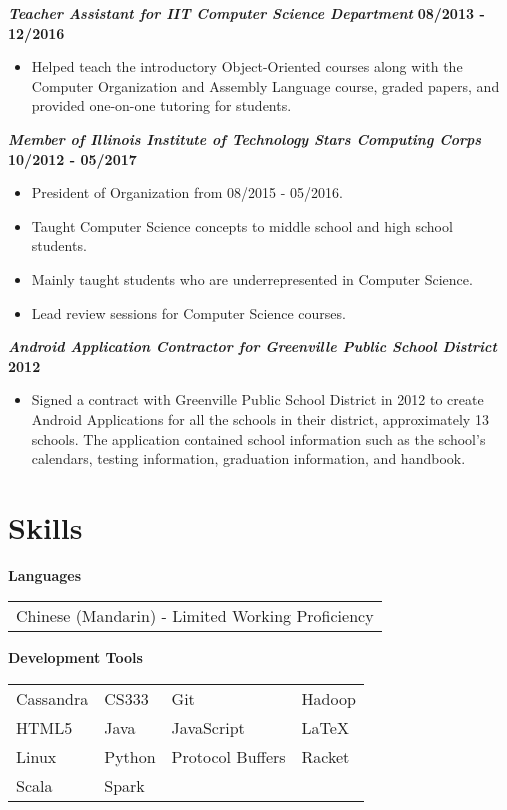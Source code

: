 \documentclass[10pt]{res}
\begin{document}
\begin{resume}
	\textbf{\textit{Teacher Assistant for IIT Computer Science Department}} 
	\vspace*{.25em}
	\hfill {\bf 08/2013 - 12/2016}
	\begin{itemize}
	  \item Helped teach the introductory Object-Oriented courses along with the Computer Organization and Assembly Language course, graded papers, and provided one-on-one tutoring for students. 
	\end{itemize}
	
	\textbf{\textit{Member of Illinois Institute of Technology Stars Computing Corps}}
	\vspace*{.25em}
	\hfill {\bf 10/2012 - 05/2017}
	\begin{itemize}
  \setlength\itemsep{0em}
	  \item President of Organization from 08/2015 - 05/2016.
	  \item Taught Computer Science concepts to middle school and high school students.  
	  \item Mainly taught students who are underrepresented in Computer Science.
	  \item Lead review sessions for Computer Science courses.
	\end{itemize}

	\textbf{\textit{Android Application Contractor for Greenville Public School District}}
	\vspace*{.25em}
	\hfill {\bf 2012}
	\begin{itemize}
		\item Signed a contract with Greenville Public School District in 2012 to create Android Applications for all the schools in their district, approximately 13 schools. The application contained school information such as the school's calendars, testing information, graduation information, and handbook.
	\end{itemize}
	
\section{Skills}
\textbf{Languages} \\ 
	\begin{tabular}{ l }
		Chinese (Mandarin) - Limited Working Proficiency
	\end{tabular}
	
	\vspace{1pt}
\textbf{Development Tools} \\
	\begin{tabular}{  l    l    l    l  }
		Cassandra 			& CS333 			& 	Git 	 		 &   Hadoop     \\ 	
		HTML5	 			& Java	 			&   JavaScript  	 & 	 LaTeX      \\
		Linux  	 			& Python   			&   Protocol Buffers &	 Racket     \\	
		Scala  			   	& Spark         	&				     &   	        \\
									
	\end{tabular}
\end{resume}
\end{document}

